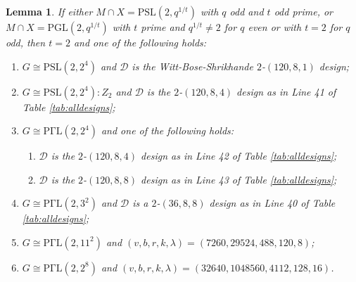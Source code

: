 \documentclass[a4paper,twopage,reqno,12pt]{amsart}
\newtheorem{lemma}[theorem]{Lemma}
\theoremstyle{definition}
\numberwithin{equation}{section}
\newcommand{\PSL}{\mathrm{PSL}}
\newcommand{\PGL}{\mathrm{PGL}}
\newcommand{\PGaL}{\mathrm{P\Gamma L}}
\newcommand{\PSiL}{\mathrm{P \Sigma L}}
\begin{document}
\begin{lemma}\label{MintX123}
If either $M\cap X=\PSL(2,q^{1/t})$  with $q$ odd and $t$ odd prime, or $M\cap X=\PGL(2,q^{1/t})$ with $t$ prime and $q^{1/t} \neq 2$ for $q$ even or with $t=2$ for $q$ odd, then $t=2$ and one of the following holds:
\begin{enumerate}
 \item $G\cong \PSL(2,2^{4})$ and 
 $\mathcal{D}$ is the Witt-Bose-Shrikhande $2$-$(120,8,1)$ design;
 
 \item $G\cong \PSL(2,2^4):Z_2$ and $\mathcal{D}$ is the $2$-$(120,8,4)$ design as in Line 41 of Table \ref{tab:alldesigns};
 
 \item $G\cong \PGaL(2,2^4)$ and one of the following holds:
 \begin{enumerate}
     \item $\mathcal{D}$ is the $2$-$(120,8,4)$ design as in Line 42 of Table \ref{tab:alldesigns};

     \item $\mathcal{D}$ is the $2$-$(120,8,8)$ design as in Line 43 of Table \ref{tab:alldesigns};
 \end{enumerate}
 
    \item $G\cong \PGaL(2,3^{2})$ and $\mathcal{D}$ is a $2$-$(36,8,8)$ design as in Line 40 of Table \ref{tab:alldesigns};
      \item $G\cong \PGaL(2,11^{2})$ and $(v,b,r,k,\lambda)=(7260,29524,488,120,8)$;
     \item $G\cong \PGaL(2,2^{8})$ and $(v,b,r,k,\lambda)=(32640,1048560,4112,128,16)$.
\end{enumerate}
\end{lemma}
\end{document}
